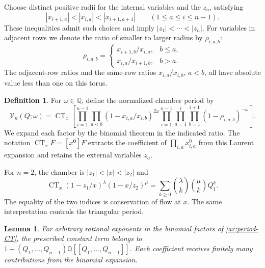 \documentclass[11pt]{amsart}
\newtheorem{lemma}[theorem]{Lemma}
\theoremstyle{definition}
\newtheorem{definition}[theorem]{Definition}
\theoremstyle{remark}
\numberwithin{equation}{section}
\newcommand{\Q}{\mathbb Q}
\DeclareMathOperator{\CT}{CT}
\begin{document}
Choose distinct positive radii for the internal variables and the
$z_a$, satisfying
\begin{equation}\label{ar:interlacing}
 |x_{i+1,a}|<|x_{i,a}|<|x_{i+1,a+1}|
 \qquad(1\leq a\leq i\leq n-1).
\end{equation}
These inequalities admit such choices and imply
$|z_1|<\cdots<|z_n|$. For variables in adjacent rows we denote
the ratio of smaller to larger radius by $\rho_{i,a,b}$:
\begin{equation}\label{ar:edge-ratio}
 \rho_{i,a,b}=
 \begin{cases}
 x_{i+1,b}/x_{i,a},& b\leq a,\\
 x_{i,a}/x_{i+1,b},& b>a.
 \end{cases}
\end{equation}
The adjacent-row ratios and the same-row ratios
$x_{i,a}/x_{i,b}$, $a<b$, all have absolute value less than one
on this torus.

\begin{definition}\label{ar:period}
For $\omega\in\Q$, define the normalized chamber period by
\begin{equation}\label{ar:period-CT}
 \mathcal V_n(Q;\omega)=\CT_x
 \left[
 \prod_{i=1}^{n-1}\prod_{a<b}
       (1-x_{i,a}/x_{i,b})^{2\omega}
 \prod_{i=1}^{n-1}\prod_{a=1}^i\prod_{b=1}^{i+1}
       (1-\rho_{i,a,b})^{-\omega}
 \right].
\end{equation}
We expand each factor by the binomial theorem in the indicated
ratio. The notation $\CT_xF=[x^{\mathbf0}]F$ extracts the
coefficient of $\prod_{i,a}x_{i,a}^0$ from this Laurent expansion
and retains the external variables $z_a$.
\end{definition}

For $n=2$, the chamber is $|z_1|<|x|<|z_2|$ and
\[
 \CT_x(1-z_1/x)^\lambda(1-x/z_2)^\mu
 =\sum_{k\geq0}\binom\lambda k\binom\mu k Q_1^k.
\]
The equality of the two indices is conservation of flow at $x$.
The same interpretation controls the triangular period.

\begin{lemma}\label{ar:flow}
For arbitrary rational exponents in the binomial factors of
\eqref{ar:period-CT}, the prescribed constant term belongs to
$1+(Q_1,\ldots,Q_{n-1})\Q[[Q_1,\ldots,Q_{n-1}]]$.
Each coefficient receives finitely many contributions from the
binomial expansion.
\end{lemma}
\end{document}
